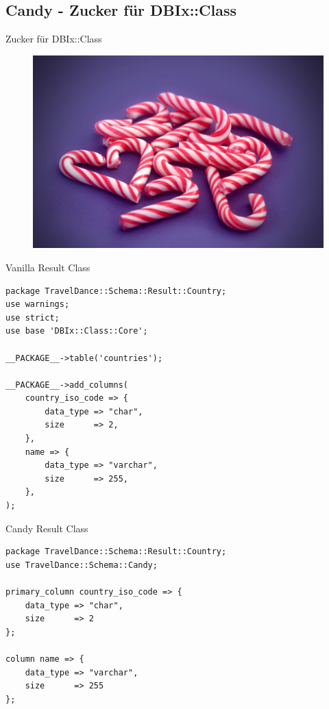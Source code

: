 \subsection{Candy - Zucker für DBIx::Class}

\begin{frame}{Zucker für DBIx::Class}
\begin{figure}[!ht]
\centering
\includegraphics[width=0.8\linewidth]{img/candy-cane.jpg}
\end{figure}
\end{frame}

\begin{frame}[fragile]{Vanilla Result Class}
\begin{lstlisting}
package TravelDance::Schema::Result::Country;
use warnings;
use strict;
use base 'DBIx::Class::Core';

__PACKAGE__->table('countries');

__PACKAGE__->add_columns(
    country_iso_code => {
        data_type => "char",
        size      => 2,
    },
    name => {
        data_type => "varchar",
        size      => 255,
    },
);
\end{lstlisting}
\end{frame}

\begin{frame}[fragile]{Candy Result Class}
\begin{lstlisting}
package TravelDance::Schema::Result::Country;
use TravelDance::Schema::Candy;

primary_column country_iso_code => {
    data_type => "char",
    size      => 2
};

column name => {
    data_type => "varchar",
    size      => 255
};
\end{lstlisting}
\end{frame}

